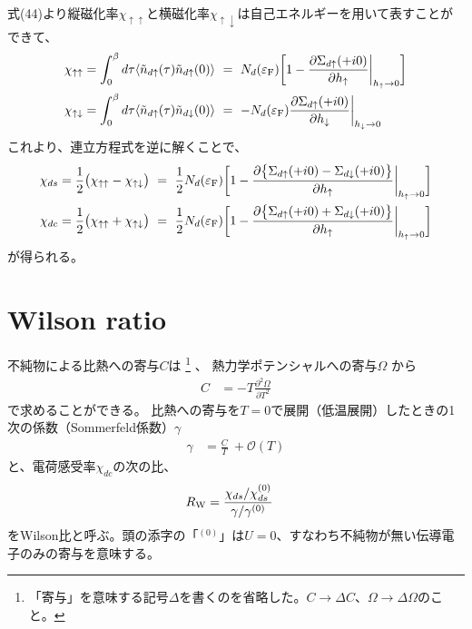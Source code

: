 \documentclass[a4j]{jarticle}
\begin{document}
式(44)より縦磁化率$\chi_{\uparrow \uparrow}$と横磁化率$\chi_{\uparrow \downarrow}$は自己エネルギーを用いて表すことができて、
\begin{align}
	\chi_{\uparrow \uparrow}
	 & =
	\int^{\beta}_{0}d \tau
	\langle
	\tilde{n}_{d \uparrow}(\tau)
	\tilde{n}_{d \uparrow}(0)
	\rangle
	\ = \
	N_{d}(\varepsilon_{\rm F})
	\bigg[
		1
		-
		\frac{\partial \Sigma_{d \uparrow} (+i0) }{\partial h_{\uparrow}}
		\bigg|_{h_{\uparrow} \to 0}
		\bigg]
	\\
	\chi_{\uparrow \downarrow}
	 & =
	\int^{\beta}_{0}d \tau
	\langle
	\tilde{n}_{d \uparrow}(\tau)
	\tilde{n}_{d \downarrow}(0)
	\rangle
	\ = \
	-
	N_{d}(\varepsilon_{\rm F})
	\frac{\partial \Sigma_{d \uparrow} (+i0) }{\partial h_{\downarrow}}
	\bigg|_{h_{\downarrow} \to 0}
\end{align}
これより、連立方程式を逆に解くことで、
\begin{align}
	\chi_{ds}
	 & =
	\frac{1}{2}
	\big(
	\chi_{\uparrow \uparrow}
	-
	\chi_{\uparrow \downarrow}
	\big)
	\ = \
	\frac{1}{2}
	N_{d}(\varepsilon_{\rm F})
	\bigg[
		1
		-
		\frac{\partial \big\{ \Sigma_{d \uparrow} (+i0) - \Sigma_{d \downarrow} (+i0) \big\} }{\partial h_{\uparrow}}
		\bigg|_{h_{\uparrow} \to 0}
		\bigg]
	\\
	\chi_{dc}
	 & =
	\frac{1}{2}
	\big(
	\chi_{\uparrow \uparrow}
	+
	\chi_{\uparrow \downarrow}
	\big)
	\ = \
	\frac{1}{2}
	N_{d}(\varepsilon_{\rm F})
	\bigg[
		1
		-
		\frac{\partial\big\{ \Sigma_{d \uparrow} (+i0) + \Sigma_{d \downarrow} (+i0) \big\} }{\partial h_{\uparrow}}
		\bigg|_{h_{\uparrow} \to 0}
		\bigg]
\end{align}
が得られる。

\section*{Wilson ratio}

不純物による比熱への寄与$C$は
\footnote{「寄与」を意味する記号$\Delta$を書くのを省略した。$C \to \Delta C$、$\Omega \to \Delta \Omega$のこと。}
、
熱力学ポテンシャルへの寄与$\Omega$
から
\begin{align}
	C
	 & =
	-T
	\frac{\partial^{2} \Omega}{\partial T^{2}}
\end{align}
で求めることができる。
比熱への寄与を$T=0$で展開（低温展開）したときの1次の係数（Sommerfeld係数）$\gamma$
\begin{align}
	\gamma
	 & =
	\frac{C}{T}
	\
	+
	\mathcal{O}(T)
\end{align}
と、電荷感受率$\chi_{dc}$の次の比、
\begin{align}
	R_{\rm W}
	 & =
	\frac{\chi_{ds}/\chi_{ds}^{(0)}}{\gamma/\gamma^{(0)}}
\end{align}
をWilson比と呼ぶ。頭の添字の「$^{(0)}$」は$U=0$、すなわち不純物が無い伝導電子のみの寄与を意味する。
\end{document}
